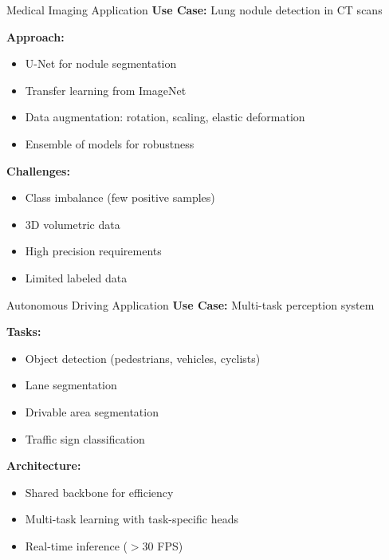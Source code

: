\documentclass[aspectratio=169,10pt]{beamer}
\begin{document}
\begin{frame}{Medical Imaging Application}
\textbf{Use Case:} Lung nodule detection in CT scans

\textbf{Approach:}
\begin{itemize}
\item U-Net for nodule segmentation
\item Transfer learning from ImageNet
\item Data augmentation: rotation, scaling, elastic deformation
\item Ensemble of models for robustness
\end{itemize}

\textbf{Challenges:}
\begin{itemize}
\item Class imbalance (few positive samples)
\item 3D volumetric data
\item High precision requirements
\item Limited labeled data
\end{itemize}
\end{frame}

\begin{frame}{Autonomous Driving Application}
\textbf{Use Case:} Multi-task perception system

\textbf{Tasks:}
\begin{itemize}
\item Object detection (pedestrians, vehicles, cyclists)
\item Lane segmentation
\item Drivable area segmentation
\item Traffic sign classification
\end{itemize}

\textbf{Architecture:}
\begin{itemize}
\item Shared backbone for efficiency
\item Multi-task learning with task-specific heads
\item Real-time inference ($>$30 FPS)
\end{itemize}
\end{frame}
\end{document}
